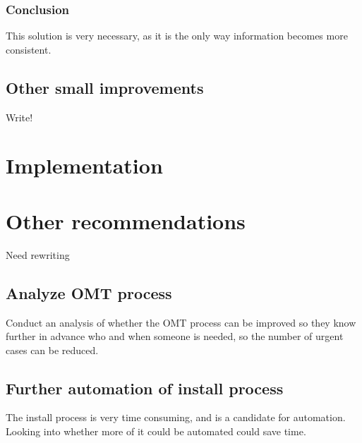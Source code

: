 \subsubsection{Conclusion} 
This solution is very necessary, as it is the only way information becomes more consistent.

\subsection{Other small improvements}

Write! 


\section{Implementation}

\section{Other recommendations}
Need rewriting 

\subsection{Analyze OMT process}
Conduct an analysis of whether the OMT process can be improved so they know further in advance who and when someone is needed, so the number of urgent cases can be reduced.

\subsection{Further automation of install process}
The install process is very time consuming, and is a candidate for automation.
Looking into whether more of it could be automated could save time.

